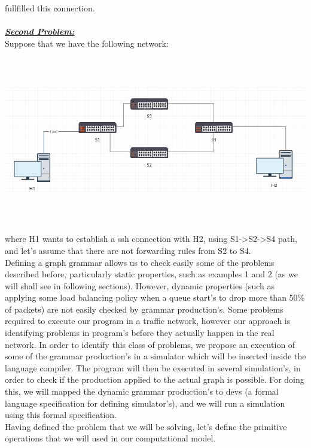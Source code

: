 \documentclass[envcountsect,runningheads]{llncs}
\begin{document}
fullfilled this connection. \\
\\
\textbf{\underline{\textit{Second Problem:}}} \\
Suppose that we have the following network:\\
\includegraphics[width=\textwidth, height=8cm]{second_example.png}\\
where H1 wants to establish a ssh connection with H2, using S1->S2->S4 path, and 
let's assume that there are not forwarding rules from S2 to S4. 
\\

Defining a graph grammar allows us to check easily some of the problems described 
before, particularly static properties, such as examples 1 and 2 (as we will shall see in following
sections). However, dynamic properties (such as applying some load balancing policy when a 
queue start's to drop more than 50\% of packets) are not easily checked by grammar 
production's. Some problems required to execute our program in a traffic network, 
however our approach is identifying problems in program's before they actually 
happen in the real network. In order to identify this class of problems, we 
propose an execution of some of the grammar production's in a simulator which 
will be inserted inside the language compiler. The program will then be executed 
in several simulation's, in order to check if the production applied to the actual graph is 
possible. For doing this, we will mapped the dynamic grammar production's to 
devs (a formal language specification for defining simulator's), and we will run a simulation 
using this formal specification.\\
Having defined the problem that we will be solving, let's define the primitive 
operations that we will used in our computational model.
\end{document}
